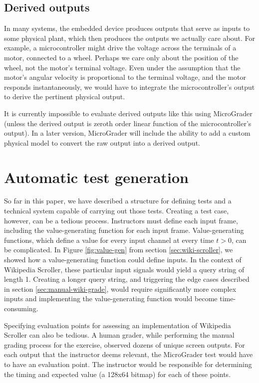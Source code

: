 \documentclass[12pt]{article}
\begin{document}
\subsection{Derived outputs}
\label{sec:derived-outputs}
In many systems, the embedded device produces outputs that serve as inputs to some physical plant, which then produces the outputs we actually care about.  For example, a microcontroller might drive the voltage across the terminals of a motor, connected to a wheel.  Perhaps we care only about the position of the wheel, not the motor's terminal voltage.  Even under the assumption that the motor's angular velocity is proportional to the terminal voltage, and the motor responds instantaneously, we would have to integrate the microcontroller's output to derive the pertinent physical output.

It is currently impossible to evaluate derived outputs like this using MicroGrader (unless the derived output is zeroth order linear function of the microcontroller's output).  In a later version, MicroGrader will include the ability to add a custom physical model to convert the raw output into a derived output.

\clearpage
\section{Automatic test generation}
So far in this paper, we have described a structure for defining tests and a technical system capable of carrying out those tests.  Creating a test case, however, can be a tedious process.  Instructors must define each input frame, including the value-generating function for each input frame.  Value-generating functions, which define a value for every input channel at every time $t>0$, can be complicated.  In Figure \ref{fig:value-gen} from section \ref{sec:wiki-scroller}, we showed how a value-generating function could define inputs.  In the context of Wikipedia Scroller, these particular input signals would yield a query string of length 1.  Creating a longer query string, and triggering the edge cases described in section \ref{sec:manual-wiki-grade}, would require significantly more complex inputs and implementing the value-generating function would become time-consuming.

Specifying evaluation points for assessing an implementation of Wikipedia Scroller can also be tedious.  A human grader, while performing the manual grading process for the exercise, observed dozens of unique screen outputs.  For each output that the instructor deems relevant, the MicroGrader test would have to have an evaluation point.  The instructor would be responsible for determining the timing and expected value (a 128x64 bitmap) for each of these points.
\end{document}
